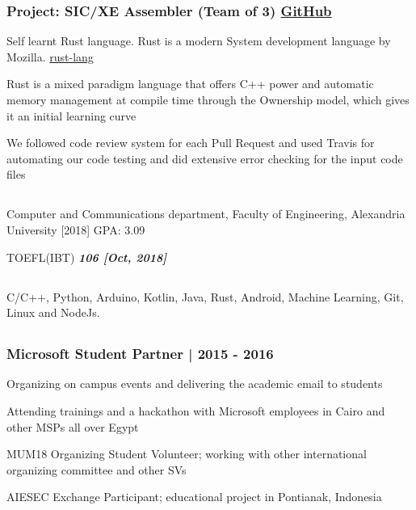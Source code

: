 \documentclass[paper=a4,fontsize=11pt]{scrartcl} %
\newcommand{\BoldIt}[1]{\textbf{\textit{#1}}}
\newcommand{\colorsubsec}[1]{\subsection{\color{AccentColor}{#1}}}
\begin{document}
\subsubsection{Project: SIC/XE Assembler (Team of 3) \href{https://github.com/oddcoder/sickassembler}{GitHub}}
\begin{itemize*}
	\item Self learnt Rust language. Rust is a modern System development language by Mozilla. \href{https://www.rust-lang.org/}{rust-lang}
	\item Rust is a mixed paradigm language that offers C++ power and automatic memory management at compile time through the Ownership model, which gives it an initial  learning curve
	\item We followed code review system for each Pull Request and used Travis for automating our code testing and did extensive error checking for the input code files
	
\end{itemize*}
\colorsubsec{Education}
\begin{itemize*}
	\item Computer and Communications department, Faculty of Engineering, Alexandria University [2018] GPA: 3.09
	\item TOEFL(IBT) \BoldIt{106 [Oct, 2018]}
\end{itemize*}
\colorsubsec{Languages and Technologies}
\begin{itemize*}
	\item C/C++, Python, Arduino, Kotlin, Java, Rust, Android, Machine Learning, Git, Linux and NodeJs.
\end{itemize*}
\colorsubsec{Extracurricular Activities}
\subsubsection{Microsoft Student Partner | 2015 - 2016}
\begin{itemize*}
	\item Organizing on campus events and delivering the academic email to students
	\item Attending trainings and a hackathon with Microsoft employees in Cairo and other MSPs all over Egypt
\end{itemize*}

\begin{itemize*}
	\item MUM18 Organizing Student Volunteer; working with other international organizing committee and other SVs
	\item AIESEC Exchange Participant; educational project in Pontianak, Indonesia
\end{itemize*}
\end{document}
